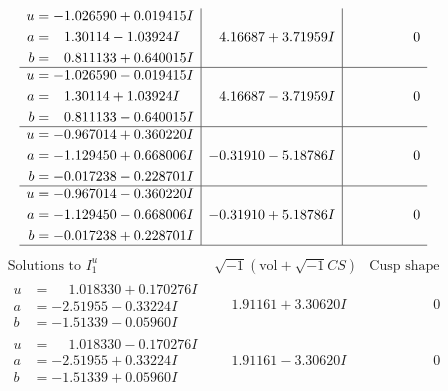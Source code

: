 \documentclass[1p]{elsarticle_modified}
\theoremstyle{definition}
\newcommand{\I}{\sqrt{-1}}
\begin{document}
$$\begin{array}{c|c|c}
\begin{aligned}
u &= -1.026590 + 0.019415 I \\
a &= \phantom{-}1.30114 - 1.03924 I \\
b &= \phantom{-}0.811133 + 0.640015 I\end{aligned}
 & \phantom{-}4.16687 + 3.71959 I & \phantom{-0.000000 } 0 \\ \hline\begin{aligned}
u &= -1.026590 - 0.019415 I \\
a &= \phantom{-}1.30114 + 1.03924 I \\
b &= \phantom{-}0.811133 - 0.640015 I\end{aligned}
 & \phantom{-}4.16687 - 3.71959 I & \phantom{-0.000000 } 0 \\ \hline\begin{aligned}
u &= -0.967014 + 0.360220 I \\
a &= -1.129450 + 0.668006 I \\
b &= -0.017238 - 0.228701 I\end{aligned}
 & -0.31910 - 5.18786 I & \phantom{-0.000000 } 0 \\ \hline\begin{aligned}
u &= -0.967014 - 0.360220 I \\
a &= -1.129450 - 0.668006 I \\
b &= -0.017238 + 0.228701 I\end{aligned}
 & -0.31910 + 5.18786 I & \phantom{-0.000000 } 0\\
 \hline 
 \end{array}$$\newpage$$\begin{array}{c|c|c}  
\text{Solutions to }I^u_{1}& \I (\text{vol} + \sqrt{-1}CS) & \text{Cusp shape}\\
 \hline 
\begin{aligned}
u &= \phantom{-}1.018330 + 0.170276 I \\
a &= -2.51955 - 0.33224 I \\
b &= -1.51339 - 0.05960 I\end{aligned}
 & \phantom{-}1.91161 + 3.30620 I & \phantom{-0.000000 } 0 \\ \hline\begin{aligned}
u &= \phantom{-}1.018330 - 0.170276 I \\
a &= -2.51955 + 0.33224 I \\
b &= -1.51339 + 0.05960 I\end{aligned}
 & \phantom{-}1.91161 - 3.30620 I & \phantom{-0.000000 } 0 \\ \hline\begin{aligned}

\end{aligned}
\end{array}$$
\end{document}
